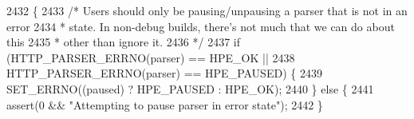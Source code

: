 \begin{DoxyCode}
2432                                                    \{
2433   \textcolor{comment}{/* Users should only be pausing/unpausing a parser that is not in an error}
2434 \textcolor{comment}{   * state. In non-debug builds, there's not much that we can do about this}
2435 \textcolor{comment}{   * other than ignore it.}
2436 \textcolor{comment}{   */}
2437   \textcolor{keywordflow}{if} (HTTP_PARSER_ERRNO(parser) == HPE_OK ||
2438       HTTP_PARSER_ERRNO(parser) == HPE_PAUSED) \{
2439     SET_ERRNO((paused) ? HPE_PAUSED : HPE_OK);
2440   \} \textcolor{keywordflow}{else} \{
2441     assert(0 && \textcolor{stringliteral}{"Attempting to pause parser in error state"});
2442   \}
\end{DoxyCode}
